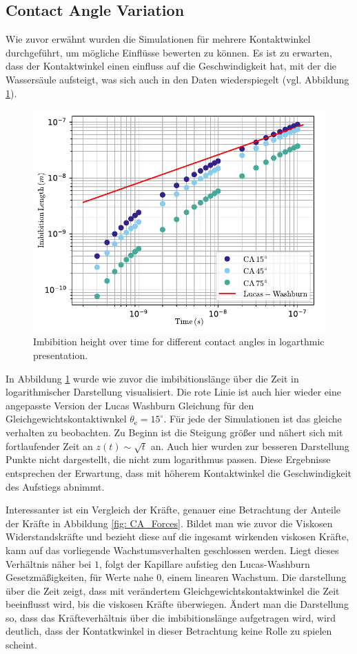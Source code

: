 \subsection{Contact Angle Variation}
Wie zuvor erwähnt wurden die Simulationen für mehrere Kontaktwinkel durchgeführt, um mögliche Einflüsse bewerten zu können. Es ist zu erwarten, dass der Kontaktwinkel einen einfluss auf die Geschwindigkeit hat, mit der die Wassersäule aufsteigt, was sich auch in den Daten wiederspiegelt (vgl. Abbildung \ref{fig: CAVar_z_overTime}). 
\begin{figure}[h]
    \centering
    \includegraphics[width=.95\textwidth]{Pictures/loglog_z_over__time_CA_Var.pdf}
    \caption{Imbibition height over time for different contact angles in logarthmic presentation.}
    \label{fig: CAVar_z_overTime} 
\end{figure}
In Abbildung \ref{fig: CAVar_z_overTime} wurde wie zuvor die imbibitionslänge über die Zeit in logarithmischer Darstellung visualisiert. Die rote Linie ist auch hier wieder eine angepasste Version der Lucas Washburn Gleichung für den Gleichgewichtskontaktiwnkel $\theta_{\mathrm{e}}= 15^{\circ}$. Für jede der Simulationen ist das gleiche verhalten zu beobachten. Zu Beginn ist die Steigung größer und nähert sich mit fortlaufender Zeit an $z(t)\sim \sqrt{t}$ an. Auch hier wurden zur besseren Darstellung Punkte nicht dargestellt, die nicht zum logarithmus passen. Diese Ergebnisse entsprechen der Erwartung, dass mit höherem Kontaktwinkel die Geschwindigkeit des Aufstiegs abnimmt.

Interessanter ist ein Vergleich der Kräfte, genauer eine Betrachtung der Anteile der Kräfte in Abbildung \ref{fig: CA_Forces}. Bildet man wie zuvor die Viskosen Widerstandskräfte und bezieht diese auf die ingesamt wirkenden viskosen Kräfte, kann auf das vorliegende Wachstumsverhalten geschlossen werden. Liegt dieses Verhältnis näher bei $1$, folgt der Kapillare aufstieg den Lucas-Washburn Gesetzmäßigkeiten, für Werte nahe $0$, einem linearen Wachstum. Die darstellung über die Zeit zeigt, dass mit verändertem Gleichgewichtskontaktwinkel die Zeit beeinflusst wird, bis die viskosen Kräfte überwiegen. Ändert man die Darstellung so, dass das Kräfteverhältnis über die imbibitionslänge aufgetragen wird, wird deutlich, dass der Kontatkwinkel in dieser Betrachtung keine Rolle zu spielen scheint. 

